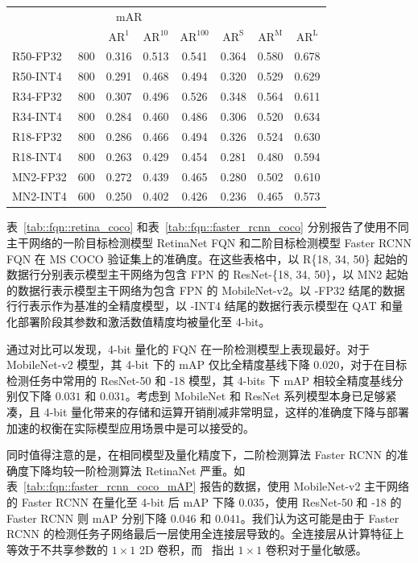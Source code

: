 \documentclass[
  fontset = mac,
]{shtthesis}
\begin{document}
\begin{table}[p]
\begin{subtable}[t]{\columnwidth}
\begin{tabular}{lc*{6}{c}}
      \multicolumn{6}{c}{mAR} \\
      & & $\mathrm{AR}^{1}$ & $\mathrm{AR}^{10}$ & $\mathrm{AR}^{100}$ &
      $\mathrm{AR} ^ {\mathrm{S}}$ & $\mathrm{AR} ^ {\mathrm{M}}$ & $\mathrm{AR} ^ {\mathrm{L}}$ \\
      \midrule
      R50-FP32 & 800 &0.316 &0.513 &0.541 &0.364 &0.580 &0.678 \\
      R50-INT4 & 800 &0.291 &0.468 &0.494 &0.320 &0.529 &0.629 \\
      \hdashline
      R34-FP32 & 800 &0.307 &0.496 &0.526 &0.348 &0.564 &0.611 \\
      R34-INT4 & 800 &0.284 &0.460 &0.486 &0.306 &0.520 &0.634 \\
      \hdashline
      R18-FP32 & 800 &0.286 &0.466 &0.494 &0.326 &0.524 &0.630 \\
      R18-INT4 & 800 &0.263 &0.429 &0.454 &0.281 &0.480 &0.594 \\
      \hdashline
      MN2-FP32 & 600 &0.272 &0.439 &0.465 &0.280 &0.502 &0.610 \\
      MN2-INT4 & 600 &0.250 &0.402 &0.426 &0.236 &0.465 &0.573 \\
      \bottomrule
    \end{tabular}
  \end{subtable}
\end{table}

表~\ref{tab::fqn::retina_coco} 和表~\ref{tab::fqn::faster_rcnn_coco} 分别报告了使用不同主干网络的一阶目标检测模型 RetinaNet FQN 和二阶目标检测模型 Faster RCNN FQN 在 MS COCO 验证集上的准确度。在这些表格中，以 R\{18, 34, 50\} 起始的数据行分别表示模型主干网络为包含 FPN 的 ResNet-\{18, 34, 50\}，以 MN2 起始的数据行表示模型主干网络为包含 FPN 的 MobileNet-v2。以 -FP32 结尾的数据行行表示作为基准的全精度模型，以 -INT4 结尾的数据行表示模型在 QAT 和量化部署阶段其参数和激活数值精度均被量化至 4-bit。

通过对比可以发现，4-bit 量化的 FQN 在一阶检测模型上表现最好。对于 MobileNet-v2 模型，其 4-bit 下的 mAP 仅比全精度基线下降 $0.020$，对于在目标检测任务中常用的 ResNet-50 和 -18 模型，其 4-bits 下 mAP 相较全精度基线分别仅下降 $0.031$ 和 $0.031$。考虑到 MobileNet 和 ResNet 系列模型本身已足够紧凑，且 4-bit 量化带来的存储和运算开销削减非常明显，这样的准确度下降与部署加速的权衡在实际模型应用场景中是可以接受的。

同时值得注意的是，在相同模型及量化精度下，二阶检测算法 Faster RCNN 的准确度下降均较一阶检测算法 RetinaNet 严重。如表~\ref{tab::fqn::faster_rcnn_coco_mAP} 报告的数据，使用 MobileNet-v2 主干网络的 Faster RCNN 在量化至 4-bit 后 mAP 下降 $0.035$，使用 ResNet-50 和 -18 的 Faster RCNN 则 mAP 分别下降 $0.046$ 和 $0.041$。我们认为这可能是由于 Faster RCNN 的检测任务子网络最后一层使用全连接层导致的。全连接层从计算特征上等效于不共享参数的 $1\times 1$ 2D 卷积，而~\citet{krishnamoorthi2018quantizing} 指出 $1\times 1$ 卷积对于量化敏感。
\end{document}

